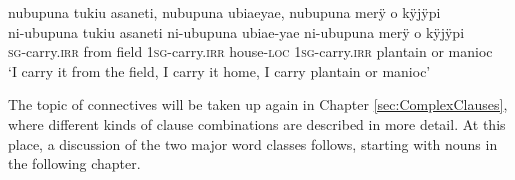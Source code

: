 \ea\label{ex:plantainoryuca}
\begingl
\glpreamble nubupuna tukiu asaneti, nubupuna ubiaeyae, nubupuna merÿ o kÿjÿpi \\
\gla ni-ubupuna tukiu asaneti ni-ubupuna ubiae-yae ni-ubupuna merÿ o kÿjÿpi\\
\textsc{sg}-carry.\textsc{irr} from field 1\textsc{sg}-carry.\textsc{irr} house-\textsc{loc} 1\textsc{sg}-carry.\textsc{irr} plantain or manioc\\
\glft ‘I carry it from the field, I carry it home, I carry plantain or manioc’
\endgl
\trailingcitation{[rxx-e181020le]}
\xe






The topic of connectives will be taken up again in Chapter \ref{sec:ComplexClauses}, where different kinds of clause combinations are described in more detail. At this place, a discussion of the two major word classes follows, starting with nouns in the following chapter.

